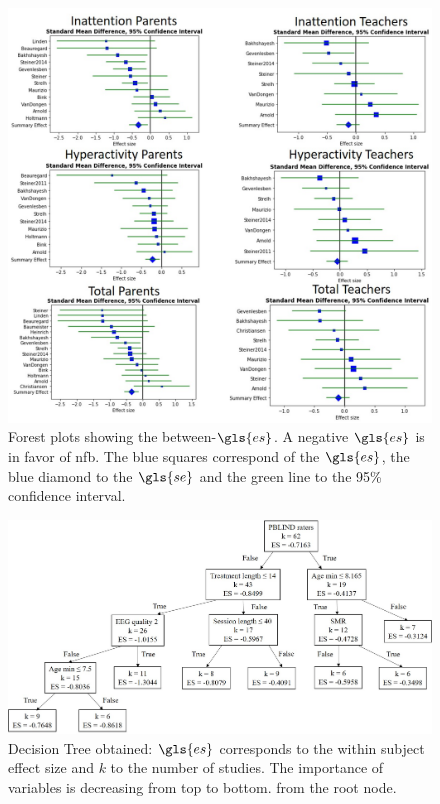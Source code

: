 \begin{figure}[h!]
  \centering
  \includegraphics[width=1.0\linewidth]{figures/meta_review_forest_plots_update_meta_analysis_our_choices_no_colors_2-columns_fitting_image.jpg}
  \caption{Forest plots showing the between-$\gls{es}$. A negative $\gls{es}$ is in favor of \gls{nfb}. 
	The blue squares correspond of the $\gls{es}$, the blue diamond to the $\gls{se}$ and the green line to the 95\% confidence interval.}
  \label{Figure:meta_review_forest_plots_update_meta_analysis_our_choices_no_colors_2-columns_fitting_image}
\end{figure}

\begin{figure}[h!]
  \centering
  \includegraphics[width=1.0\linewidth]{figures/factors_analysis_decision_tree_results_no_colors_2-columns_fitting_image.jpg}
  \caption{Decision Tree obtained: $\gls{es}$ corresponds to the within subject effect size and $k$ to the number of studies. 
  The importance of variables is decreasing from top to bottom.
	from the root node.}
  \label{Figure:factors_analysis_decision_tree_results}
\end{figure}

